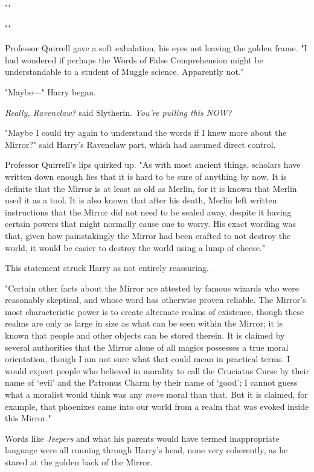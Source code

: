 ""

""

Professor Quirrell gave a soft exhalation, his eyes not leaving the golden 
frame. "I had wondered if perhaps the Words of False Comprehension might be 
understandable to a student of Muggle science. Apparently not."

"Maybe---" Harry began.

\emph{Really, Ravenclaw?} said Slytherin. \emph{You're pulling this NOW?}

"Maybe I could try again to understand the words if I knew more about the 
Mirror?" said Harry's Ravenclaw part, which had assumed direct control.

Professor Quirrell's lips quirked up. "As with most ancient things, scholars 
have written down enough lies that it is hard to be sure of anything by now. It 
is definite that the Mirror is at least as old as Merlin, for it is known that 
Merlin used it as a tool. It is also known that after his death, Merlin left 
written instructions that the Mirror did not need to be sealed away, despite it 
having certain powers that might normally cause one to worry. His exact wording 
was that, given how painstakingly the Mirror had been crafted to not destroy 
the world, it would be easier to destroy the world using a lump of cheese."

This statement struck Harry as not entirely reassuring.

"Certain other facts about the Mirror are attested by famous wizards who were 
reasonably skeptical, and whose word has otherwise proven reliable. The 
Mirror's most characteristic power is to create alternate realms of existence, 
though these realms are only as large in size as what can be seen within the 
Mirror; it is known that people and other objects can be stored therein. It is 
claimed by several authorities that the Mirror alone of all magics possesses a 
true moral orientation, though I am not sure what that could mean in practical 
terms. I would expect people who believed in morality to call the Cruciatus 
Curse by their name of `evil' and the Patronus Charm by their name of `good'; I 
cannot guess what a moralist would think was any \emph{more} moral than that. 
But it is claimed, for example, that phoenixes came into our world from a realm 
that was evoked inside this Mirror."

Words like \emph{Jeepers} and what his parents would have termed inappropriate 
language were all running through Harry's head, none very coherently, as he 
stared at the golden back of the Mirror.

